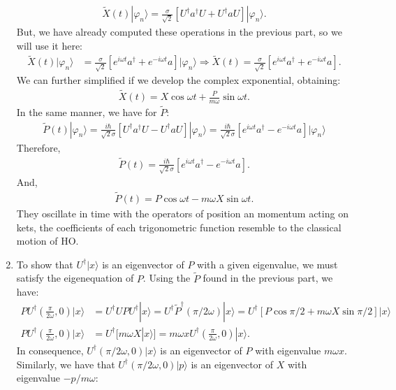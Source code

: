 \documentclass[letterpaper,11pt,twoside]{article}
\newcommand{\ket}[1]{|#1\rangle}
\begin{document}
\begin{enumerate}[itemsep=0pt,topsep=0pt,label=\alph*)]
\begin{align*}
    \tilde{X}(t)\ket{\varphi_n}=\frac{\sigma}{\sqrt{2}}\left[U^\dagger a^\dagger U+U^\dagger aU\right]\ket{\varphi_n}.
  \end{align*}
  But, we have already computed these operations in the previous part, so we will use it here:
  \begin{align*}
    \tilde{X}(t)\ket{\varphi_n}&=\frac{\sigma}{\sqrt{2}}\left[e^{i\omega t}a^\dagger+e^{-i\omega t}a\right]\ket{\varphi_n}\Longrightarrow \tilde{X}(t)=\frac{\sigma}{\sqrt{2}}\left[e^{i\omega t}a^\dagger+e^{-i\omega t}a\right].
  \end{align*}
  We can further simplified if we develop the complex exponential, obtaining:
  \begin{align*}
    \tilde{X}(t)=X\cos\omega t+\frac{P}{m\omega}\sin\omega t.
  \end{align*}
  In the same manner, we have for $\tilde{P}$:
  \begin{align*}
    \tilde{P}(t)\ket{\varphi_n}=\frac{i\hbar}{\sqrt{2}\sigma}\left[U^\dagger a^\dagger U-U^\dagger aU\right]\ket{\varphi_n}=\frac{i\hbar}{\sqrt{2}\sigma}\left[e^{i\omega t}a^\dagger-e^{-i\omega t}a\right]\ket{\varphi_n}
  \end{align*}
  Therefore,
  \begin{align*}
    \tilde{P}(t)=\frac{i\hbar}{\sqrt{2}\sigma}\left[e^{i\omega t}a^\dagger-e^{-i\omega t}a\right].
  \end{align*}
  And, 
  \begin{align*}
    \tilde{P}(t)=P\cos\omega t-m\omega X\sin\omega t.
  \end{align*}
  They oscillate in time with the operators of position an momentum acting on kets, the coefficients of each trigonometric function resemble to the classical motion of HO.
  \item To show that $U^\dagger\ket{x}$ is an eigenvector of $P$ with a given eigenvalue, we must satisfy the eigenequation of $P$. Using the $\tilde{P}$ found in the previous part, we have:
  \begin{align*}
    PU^\dagger(\frac{\pi}{2\omega},0)\ket{x}&=U^\dagger UPU^\dagger\ket{x}=U^\dagger \tilde{P}^\dagger(\pi/2\omega)\ket{x}=U^\dagger[P\cos\pi/2+m\omega X\sin\pi/2]\ket{x}\\
    PU^\dagger(\frac{\pi}{2\omega},0)\ket{x}&=U^\dagger[m\omega X\ket{x}]=m\omega xU^\dagger(\frac{\pi}{2\omega},0)\ket{x}.
  \end{align*}
  In consequence, $U^\dagger(\pi/2\omega,0)\ket{x}$ is an eigenvector of $P$ with eigenvalue $m\omega x$.
  Similarly, we have that $U^\dagger(\pi/2\omega,0)\ket{p}$ is an eigenvector of $X$ with eigenvalue $-p/m\omega$:

\end{enumerate}
\end{document}
